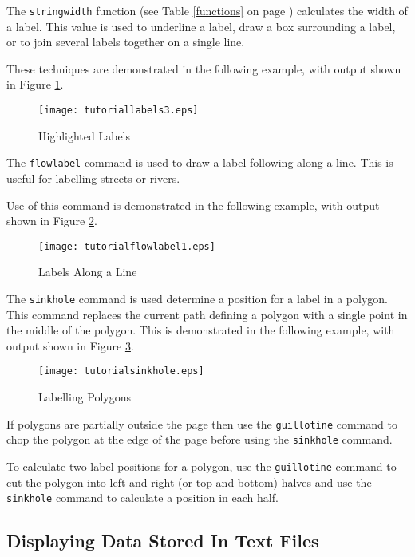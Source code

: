 The \texttt{stringwidth} function (see Table \ref{functions}
on page \pageref{functions}) calculates the
width of a label.  This value is used to underline a label, draw a box
surrounding a label, or to join several labels together on a single line.

These techniques are demonstrated in the following example,
with output shown in Figure \ref{tutoriallabels3}.



\begin{figure}[htb]
\texttt{[image: tutoriallabels3.eps]}
\caption{Highlighted Labels}
\label{tutoriallabels3}
\end{figure}

The \texttt{flowlabel} command is used to draw a label
following along a line.  This is useful for labelling streets or
rivers.

Use of this command is demonstrated in the following example,
with output shown in Figure \ref{tutoriallabels4}.



\begin{figure}[htb]
\texttt{[image: tutorialflowlabel1.eps]}
\caption{Labels Along a Line}
\label{tutoriallabels4}
\end{figure}

The \texttt{sinkhole} command is used determine a position
for a label in a polygon.  This command
replaces the current path defining a polygon with a single point in
the middle of the polygon.  This is demonstrated in the following
example, with output shown in Figure \ref{tutorialsinkhole}.



\begin{figure}[htb]
\texttt{[image: tutorialsinkhole.eps]}
\caption{Labelling Polygons}
\label{tutorialsinkhole}
\end{figure}

If polygons are partially outside the page then
use the \texttt{guillotine} command to chop the
polygon at the edge of the page before using the \texttt{sinkhole}
command.

To calculate two label positions for a polygon, use the \texttt{guillotine}
command to cut the polygon into left and right (or top and bottom)
halves and use the \texttt{sinkhole} command to calculate a
position in each half.

\subsection{Displaying Data Stored In Text Files}

